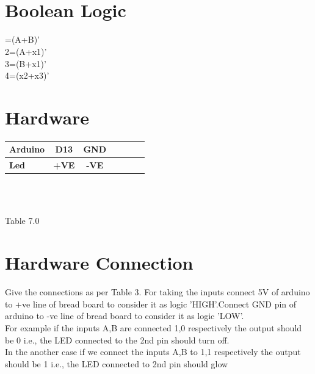 \documentclass[10pt]{report}
\begin{document}
\begin{multicols}{2}
\
 \vspace{3mm}\\
\

  
  \centering  \section{Boolean Logic}
   =(A+B)'\\
   2=(A+x1)'\\ 
   3=(B+x1)'\\
   4=(x2+x3)' \\
   
   \section{Hardware}
   \begin{tabular}{|l|c|c|c|c|c|c|} \hline 
\textbf{Arduino} & \textbf{D13} & \textbf{GND} \\ \hline
\textbf{Led} & \textbf{+VE} & \textbf{-VE}\\ \hline
\end{tabular} \\
\ 
\centerline{Table 7.0}
   
 \section{Hardware Connection}
  \raggedright
  Give the connections as per Table 3. For taking the inputs connect 5V of arduino to +ve line of bread board to consider it as logic 'HIGH'.Connect GND pin of arduino to -ve line of bread board to consider it as logic 'LOW'.\\
For example if the inputs A,B are connected 1,0 respectively the output should be 0 i.e., the LED connected to the 2nd pin should turn off.
\\
In the another case if we connect the inputs A,B to 1,1 respectively the output should be 1 i.e., the LED connected to 2nd pin should glow


\end{multicols}
\end{document}
